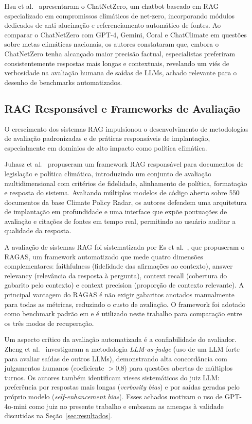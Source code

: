 \documentclass[conference]{IEEEtran}
\begin{document}
Hsu et al.~\cite{hsu2024chatnetzero} apresentaram o ChatNetZero,
um chatbot baseado em RAG especializado em compromissos climáticos
de net-zero, incorporando módulos dedicados de anti-alucinação e
referenciamento automático de fontes.
Ao comparar o ChatNetZero com GPT-4, Gemini, Coral e ChatClimate
em questões sobre metas climáticas nacionais, os autores constataram
que, embora o ChatNetZero tenha alcançado maior precisão factual,
especialistas preferiram consistentemente respostas mais longas e
contextuais, revelando um viés de verbosidade na avaliação humana
de saídas de LLMs, achado relevante para o desenho de
benchmarks automatizados.

\subsection{RAG Responsável e Frameworks de Avaliação}

O crescimento dos sistemas RAG impulsionou o desenvolvimento de
metodologias de avaliação padronizadas e de práticas responsáveis
de implantação, especialmente em domínios de alto impacto como
política climática.

Juhasz et al.~\cite{juhasz2024responsible} propuseram um framework
RAG responsável para documentos de legislação e política climática,
introduzindo um conjunto de avaliação multidimensional com critérios
de fidelidade, alinhamento de política, formatação e resposta do sistema.
Avaliando múltiplos modelos de código aberto sobre 550 documentos
da base Climate Policy Radar, os autores defendem uma arquitetura
de implantação em profundidade e uma interface que expõe pontuações
de avaliação e citações de fontes em tempo real, permitindo ao
usuário auditar a qualidade da resposta.

A avaliação de sistemas RAG foi sistematizada por
Es et al.~\cite{es2024ragas}, que propuseram o RAGAS, um framework
automatizado que mede quatro dimensões complementares: faithfulness
(fidelidade das afirmações ao contexto), answer relevancy (relevância
da resposta à pergunta), context recall (cobertura do gabarito pelo
contexto) e context precision (proporção de contexto relevante).
A principal vantagem do RAGAS é não exigir gabaritos anotados
manualmente para todas as métricas, reduzindo o custo de avaliação.
O framework foi adotado como benchmark padrão em
\cite{juhasz2024responsible} e é utilizado neste trabalho para
comparação entre os três modos de recuperação.

Um aspecto crítico da avaliação automatizada é a confiabilidade
do avaliador.
Zheng et al.~\cite{zheng2023judging} investigaram a metodologia
\textit{LLM-as-judge} (uso de um LLM forte para avaliar saídas
de outros LLMs), demonstrando alta concordância com julgamentos
humanos (coeficiente $>$0,8) para questões abertas de múltiplos
turnos.
Os autores também identificam vieses sistemáticos do juiz LLM:
preferência por respostas mais longas (\textit{verbosity bias})
e por saídas geradas pelo próprio modelo (\textit{self-enhancement
bias}).
Esses achados motivam o uso de GPT-4o-mini como juiz no presente
trabalho e embasam as ameaças à validade discutidas na
Seção~\ref{sec:resultados}.
\end{document}
